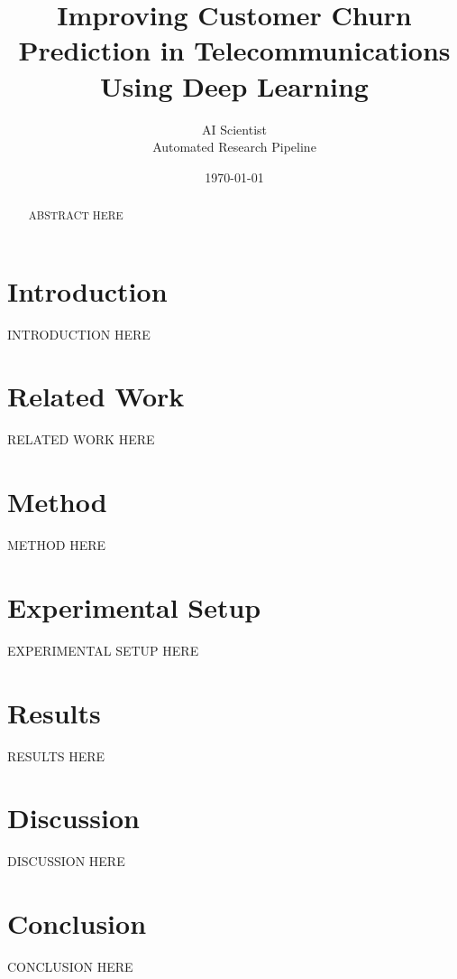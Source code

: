 \documentclass[11pt,a4paper]{article}
\begin{document}
\title{Improving Customer Churn Prediction in Telecommunications Using Deep Learning}

\author{AI Scientist \\ Automated Research Pipeline}
\date{\today}
\maketitle

\begin{abstract}
ABSTRACT HERE
\end{abstract}

\section{Introduction}
\label{sec:intro}
INTRODUCTION HERE

\section{Related Work}
\label{sec:related}
RELATED WORK HERE

\section{Method}
\label{sec:method}
METHOD HERE

\section{Experimental Setup}
\label{sec:setup}
EXPERIMENTAL SETUP HERE

\section{Results}
\label{sec:results}
RESULTS HERE

\section{Discussion}
\label{sec:discussion}
DISCUSSION HERE

\section{Conclusion}
\label{sec:conclusion}
CONCLUSION HERE

\nocite{*}


\end{document}
